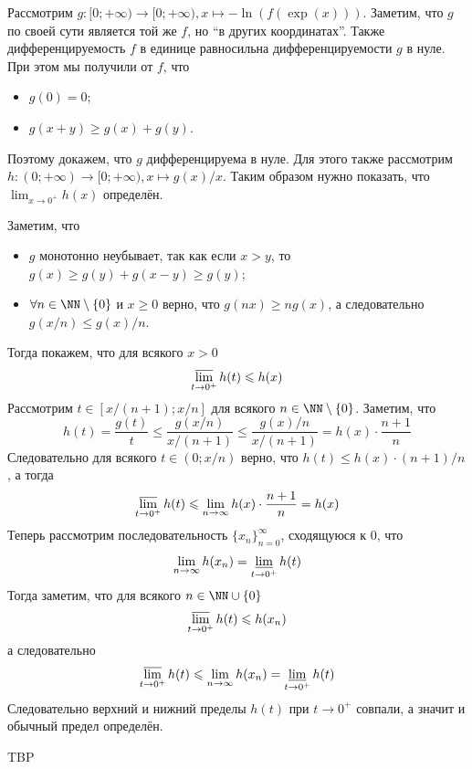 \documentclass[12pt,a4paper]{article}
\begin{document}
    \begin{enumproblem}
        Рассмотрим $g: [0; +\infty) \to [0; +\infty), x \mapsto -\ln(f(\exp(x)))$. Заметим, что $g$ по своей сути является той же $f$, но ``в других координатах''. Также дифференцируемость $f$ в единице равносильна дифференцируемости $g$ в нуле. При этом мы получили от $f$, что
        \begin{itemize}
            \item $g(0) = 0$;
            \item $g(x + y) \geqslant g(x) + g(y)$.
        \end{itemize}
        Поэтому докажем, что $g$ дифференцируема в нуле. Для этого также рассмотрим $h: (0; +\infty) \to [0; +\infty), x \mapsto g(x)/x$. Таким образом нужно показать, что $\lim_{x \to 0^+} h(x)$ определён.

        Заметим, что
        \begin{itemize}
            \item $g$ монотонно неубывает, так как если $x > y$, то $g(x) \geqslant g(y) + g(x-y) \geqslant g(y)$;
            \item $\forall n \in \NN \setminus \{0\}$ и $x \geqslant 0$ верно, что $g(nx) \geqslant ng(x)$, а следовательно $g(x/n) \leqslant g(x)/n$.
        \end{itemize}
        Тогда покажем, что для всякого $x > 0$
        \[\varlimsup_{t \to 0^+} h(t) \leqslant h(x)\]
        Рассмотрим $t \in [x/(n+1); x/n]$ для всякого $n \in \NN\setminus\{0\}$. Заметим, что
        \[h(t) = \frac{g(t)}{t} \leqslant \frac{g(x/n)}{x/(n+1)} \leqslant \frac{g(x)/n}{x/(n+1)} = h(x) \cdot \frac{n+1}{n}\]
        Следовательно для всякого $t \in (0; x/n)$ верно, что $h(t) \leqslant h(x) \cdot (n+1)/n$, а тогда
        \[\varlimsup_{t \to 0^+} h(t) \leqslant \lim_{n \to \infty} h(x) \cdot \frac{n+1}{n} = h(x)\]
        Теперь рассмотрим последовательность $\{x_n\}_{n=0}^\infty$, сходящуюся к $0$, что
        \[\lim_{n \to \infty} h(x_n) = \varliminf_{t \to 0^+} h(t)\]
        Тогда заметим, что для всякого $n \in \NN \cup \{0\}$
        \[\varlimsup_{t \to 0^+} h(t) \leqslant h(x_n)\]
        а следовательно
        \[\varlimsup_{t \to 0^+} h(t) \leqslant \lim_{n \to \infty} h(x_n) = \varliminf_{t \to 0^+} h(t)\]
        Следовательно верхний и нижний пределы $h(t)$ при $t \to 0^+$ совпали, а значит и обычный предел определён.
    \end{enumproblem}

    \begin{enumproblem}
        TBP
    \end{enumproblem}
\end{document}
